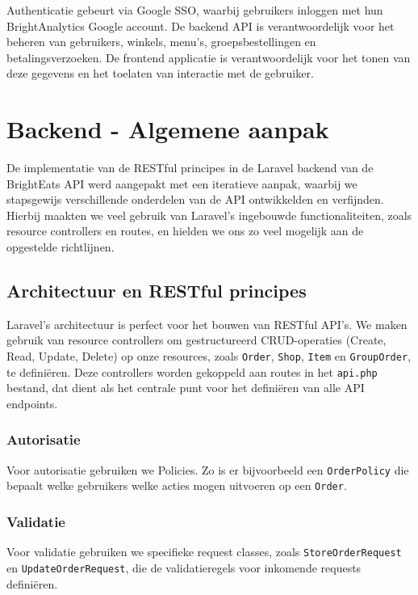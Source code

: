 \bigskip

Authenticatie gebeurt via Google SSO, waarbij gebruikers inloggen met hun BrightAnalytics Google account. De backend API is verantwoordelijk voor het beheren van gebruikers, winkels, menu's, groepsbestellingen en betalingsverzoeken. De frontend applicatie is verantwoordelijk voor het tonen van deze gegevens en het toelaten van interactie met de gebruiker.

\section{Backend - Algemene aanpak}

De implementatie van de RESTful principes in de Laravel backend van de BrightEats API werd aangepakt met een iteratieve aanpak, waarbij we stapsgewijs verschillende onderdelen van de API ontwikkelden en verfijnden. Hierbij maakten we veel gebruik van Laravel's ingebouwde functionaliteiten, zoals resource controllers en routes, en hielden we ons zo veel mogelijk aan de opgestelde richtlijnen.

\subsection{Architectuur en RESTful principes}

Laravel's architectuur is perfect voor het bouwen van RESTful API's. We maken gebruik van resource controllers om gestructureerd CRUD-operaties (Create, Read, Update, Delete) op onze resources, zoals \texttt{Order}, \texttt{Shop}, \texttt{Item} en \texttt{GroupOrder}, te definiëren. Deze controllers worden gekoppeld aan routes in het \texttt{api.php} bestand, dat dient als het centrale punt voor het definiëren van alle API endpoints.

\subsubsection{Autorisatie}

Voor autorisatie gebruiken we Policies. Zo is er bijvoorbeeld een \texttt{OrderPolicy} die bepaalt welke gebruikers welke acties mogen uitvoeren op een \texttt{Order}.

\subsubsection{Validatie}

Voor validatie gebruiken we specifieke request classes, zoals \texttt{StoreOrderRequest} en \texttt{UpdateOrderRequest}, die de validatieregels voor inkomende requests definiëren.

